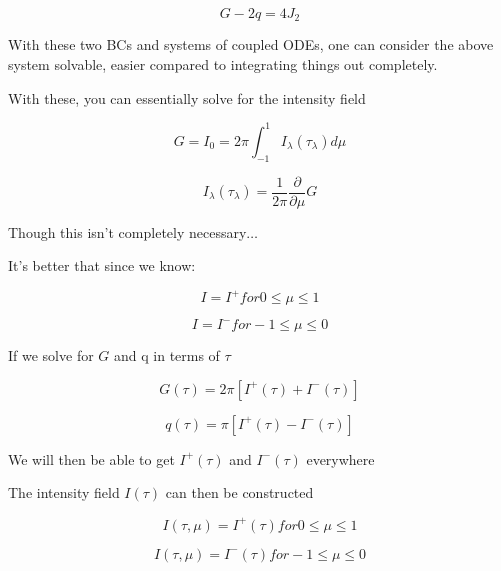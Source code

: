 \documentclass[12pt]{article}
\renewcommand{\_}{\kern-1.5pt\textunderscore\kern-1.5pt}
\begin{document}
\begin{itemize}
 \[ G-2q=4J_{2} \] \par

With these two BCs and systems of coupled ODEs, one can consider the above system solvable, easier compared to integrating things out completely. \par


\vspace{\baselineskip}
With these, you can essentially solve for the intensity field\par

 \[ G=I_{0}=2 \pi  \int _{-1}^{1}I_{ \lambda } \left(  \tau_{ \lambda } \right) d \mu  \] \par

 \[ I_{ \lambda } \left(  \tau_{ \lambda } \right) =\frac{1}{2 \pi }\frac{ \partial }{ \partial  \mu }G \] \par

Though this isn’t completely necessary$ \ldots $ \par

It’s better that since we know:\par

 \[ I=I^{+} for 0 \leq  \mu  \leq 1 \] \par

 \[ I=I^{-} for-1 \leq  \mu  \leq 0 \] \par

If we solve for  \( G \)  and q in terms of  \(  \tau \) \par

 \[ G \left(  \tau \right) =2 \pi  \left[ I^{+} \left(  \tau \right) +I^{-} \left(  \tau \right)  \right]  \] \par

 \[ q \left(  \tau \right) = \pi  \left[ I^{+} \left(  \tau \right) -I^{-} \left(  \tau \right)  \right]  \] \par

We will then be able to get  \( I^{+} \left(  \tau \right)  \)  and  \( I^{-} \left(  \tau \right)  \)  everywhere\par

The intensity field  \( I \left(  \tau \right)  \)  can then be constructed\par

 \[ I \left(  \tau, \mu  \right) =I^{+} \left(  \tau \right)  for 0 \leq  \mu  \leq 1 \] \par

 \[ I \left(  \tau, \mu  \right) =I^{-} \left(  \tau \right)  for-1 \leq  \mu  \leq 0 \] \par


\end{itemize}
\end{document}
